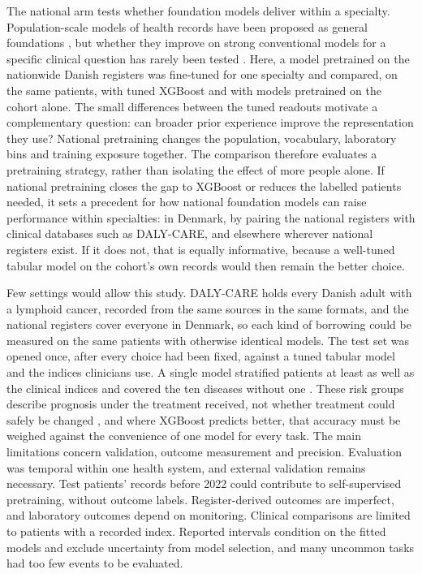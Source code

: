 The national arm tests whether foundation models deliver within a specialty.
Population-scale models of health records have been proposed as general
foundations \citep{savcisens2024life2vec,shmatko2025delphi}, but whether they
improve on strong conventional models for a specific clinical question has
rarely been tested \citep{wornow2023shaky}. Here, a model pretrained on the
nationwide Danish registers was fine-tuned for one specialty and compared, on
the same patients, with tuned XGBoost and with models pretrained on the cohort
alone. The small differences between the tuned readouts motivate a complementary
question: can broader prior experience improve the representation they use?
National pretraining changes the population, vocabulary, laboratory bins and
training exposure together. The comparison therefore evaluates a pretraining
strategy, rather than isolating the effect of more people alone.  If national pretraining closes the gap to XGBoost or
reduces the labelled patients needed, it sets a precedent for how national
foundation models can raise performance within specialties: in Denmark, by
pairing the national registers with clinical databases such as DALY-CARE, and
elsewhere wherever national registers exist. If it does not, that is equally
informative, because a well-tuned tabular model on the cohort's own records
would then remain the better choice.

Few settings would allow this study. DALY-CARE holds every Danish adult with a
lymphoid cancer, recorded from the same sources in the same formats, and the
national registers cover everyone in Denmark, so each kind of borrowing could be
measured on the same patients with otherwise identical models. The test set was
opened once, after every choice had been fixed, against a tuned tabular model
and the indices clinicians use. A single model stratified patients at least as well as 
the clinical indices and covered the ten diseases without one
. These risk groups
describe prognosis under the treatment received, not whether treatment could
safely be changed \citep{vanGeloven2020}, and where XGBoost predicts better, that
accuracy must be weighed against the convenience of one model for every task.
The main limitations concern validation, outcome measurement and precision. Evaluation
was temporal within one health system, and external validation remains
necessary. Test patients' records before 2022 could contribute to
self-supervised pretraining, without outcome labels. Register-derived outcomes
are imperfect, and laboratory outcomes depend on monitoring. Clinical
comparisons are limited to patients with a recorded index. Reported intervals
condition on the fitted models and exclude uncertainty from model selection, and
many uncommon tasks had too few events to be evaluated.

